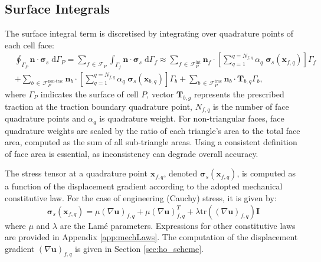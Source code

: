 \documentclass[sn-mathphys,Numbered]{sn-jnl}%
\newcommand{\bb}{\boldsymbol}
\begin{document}
\subsection{Surface Integrals}
\label{sec:vol_int}
%
The surface integral term is discretised by integrating over quadrature points of each cell face:
%
\begin{equation}\label{eq:divStressDiscret}
\begin{split}
&\oint_{\Gamma_P} \bb{n} \cdot \bb{\sigma}_s \; \text{d}\Gamma_P  
=
\sum_{f \, \in \,\mathcal{F}_P} \int_{\Gamma_f} \bb{n} \cdot \bb{\sigma}_s \; \text{d}\Gamma_f 
\approx 
\sum_{f \,\in\, \mathcal{F}_P^{\text{int}}} \bb{n}_{f} \cdot \left [ \sum_{q=1}^{q=N_{f,q}}\alpha_q \; \bb{\sigma}_s(\bb{x}_{f,q}) \right]\Gamma_f \\
& + \sum_{b\, \in \,\mathcal{F}_P^{\text{non-trac}}}  \bb{n}_{b} \cdot \left [ \sum_{q=1}^{q=N_{f,q}}\alpha_q \; \bb{\sigma}_s(\bb{x}_{b,q}) \right]\Gamma_b 
+ \sum_{b\, \in \, \mathcal{F}_P^{\text{trac}}} \bb{n}_{b} \cdot \bb{T}_{b,q} \Gamma_b,
\end{split}
\end{equation}
%
where $\Gamma_P$ indicates the surface of cell $P$, 
vector $\bb{T}_{b,g}$ represents the prescribed traction at the traction boundary quadrature point,
$N_{f,q}$ is the number of face quadrature points and
$\alpha_q$ is quadrature weight. 
For non-triangular faces, face quadrature weights are scaled by the ratio of each triangle’s area to the total face area,
computed as the sum of all sub-triangle areas. Using a consistent definition of face area is essential, 
as inconsistency can degrade overall accuracy.

The stress tensor at a quadrature point $\bb{x}_{f,q}$, denoted $\bb{\sigma}_s(\boldsymbol{x}_{f,q})$, is computed as a function of the displacement gradient according to the adopted mechanical constitutive law.
For the case of engineering (Cauchy) stress, it is given by:
\begin{equation}
\bb{\sigma}_s(\bb{x}_{f,q}) =   \mu (\nabla \bb{u})_{f,q} + \mu (\nabla \bb{u})^T_{f,q} +\lambda \text{tr}((\nabla \bb{u})_{f,q} )\mathbf{I}
\end{equation}
where $\mu$ and $\lambda$ are the Lamé parameters.
Expressions for other constitutive laws are provided in Appendix \ref{app:mechLaws}.
The computation of the displacement gradient $(\nabla \bb{u})_{f,q}$ is given in Section \ref{sec:ho_scheme}.
%
\end{document}
